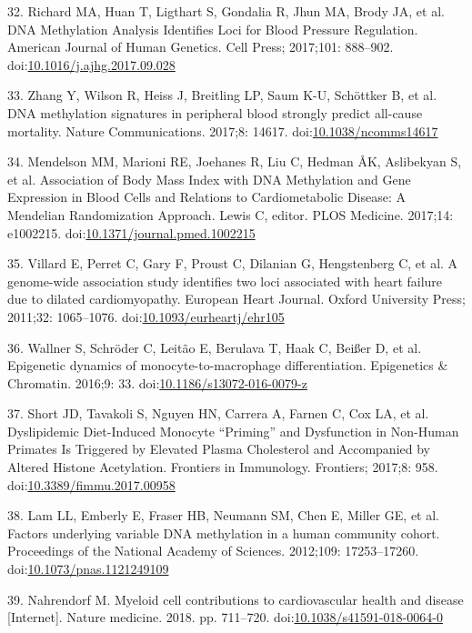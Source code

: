 \documentclass[]{article}
\theoremstyle{definition}
\theoremstyle{definition}
\theoremstyle{definition}
\theoremstyle{remark}
\begin{document}
32. Richard MA, Huan T, Ligthart S, Gondalia R, Jhun MA, Brody JA, et
al. DNA Methylation Analysis Identifies Loci for Blood Pressure
Regulation. American Journal of Human Genetics. Cell Press; 2017;101:
888--902.
doi:\href{http://dx.doi.org/10.1016/j.ajhg.2017.09.028}{10.1016/j.ajhg.2017.09.028}

33. Zhang Y, Wilson R, Heiss J, Breitling LP, Saum K-U, Sch{ö}ttker B,
et al. DNA methylation signatures in peripheral blood strongly predict
all-cause mortality. Nature Communications. 2017;8: 14617.
doi:\href{http://dx.doi.org/10.1038/ncomms14617}{10.1038/ncomms14617}

34. Mendelson MM, Marioni RE, Joehanes R, Liu C, Hedman ÅK, Aslibekyan
S, et al. Association of Body Mass Index with DNA Methylation and Gene
Expression in Blood Cells and Relations to Cardiometabolic Disease: A
Mendelian Randomization Approach. Lewis C, editor. PLOS Medicine.
2017;14: e1002215.
doi:\href{http://dx.doi.org/10.1371/journal.pmed.1002215}{10.1371/journal.pmed.1002215}

35. Villard E, Perret C, Gary F, Proust C, Dilanian G, Hengstenberg C,
et al. A genome-wide association study identifies two loci associated
with heart failure due to dilated cardiomyopathy. European Heart
Journal. Oxford University Press; 2011;32: 1065--1076.
doi:\href{http://dx.doi.org/10.1093/eurheartj/ehr105}{10.1093/eurheartj/ehr105}

36. Wallner S, Schr{ö}der C, Leit{ã}o E, Berulava T, Haak C, Bei{ß}er D,
et al. Epigenetic dynamics of monocyte-to-macrophage differentiation.
Epigenetics \& Chromatin. 2016;9: 33.
doi:\href{http://dx.doi.org/10.1186/s13072-016-0079-z}{10.1186/s13072-016-0079-z}

37. Short JD, Tavakoli S, Nguyen HN, Carrera A, Farnen C, Cox LA, et al.
Dyslipidemic Diet-Induced Monocyte ``Priming'' and Dysfunction in
Non-Human Primates Is Triggered by Elevated Plasma Cholesterol and
Accompanied by Altered Histone Acetylation. Frontiers in Immunology.
Frontiers; 2017;8: 958.
doi:\href{http://dx.doi.org/10.3389/fimmu.2017.00958}{10.3389/fimmu.2017.00958}

38. Lam LL, Emberly E, Fraser HB, Neumann SM, Chen E, Miller GE, et al.
Factors underlying variable DNA methylation in a human community cohort.
Proceedings of the National Academy of Sciences. 2012;109: 17253--17260.
doi:\href{http://dx.doi.org/10.1073/pnas.1121249109}{10.1073/pnas.1121249109}

39. Nahrendorf M. Myeloid cell contributions to cardiovascular health
and disease {[}Internet{]}. Nature medicine. 2018. pp. 711--720.
doi:\href{http://dx.doi.org/10.1038/s41591-018-0064-0}{10.1038/s41591-018-0064-0}
\end{document}

